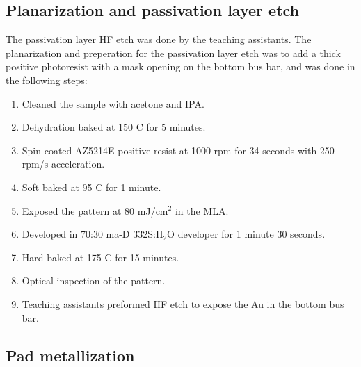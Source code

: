 \subsection{Planarization and passivation layer etch}
\label{methods:Planarization}

The passivation layer HF etch was done by the teaching assistants.
The planarization and preperation for the passivation layer etch was to add a thick positive photoresist with a mask opening on the bottom bus bar, and was done in the following steps:

\begin{enumerate}
    \item Cleaned the sample with acetone and IPA.
    \item Dehydration baked at 150 \textdegree C for 5 minutes.
    \item Spin coated AZ5214E positive resist at 1000 rpm for 34 seconds with 250 rpm/s acceleration.
    \item Soft baked at 95 \textdegree C for 1 minute.
    \item Exposed the pattern at 80 mJ/cm$^2$ in the MLA.
    \item Developed in 70:30 ma-D 332S:H$_2$O developer for 1 minute 30 seconds.
    \item Hard baked at 175 \textdegree C for 15 minutes.
    \item Optical inspection of the pattern.
    \item Teaching assistants preformed HF etch to expose the Au in the bottom bus bar.
\end{enumerate}



\subsection{Pad metallization}
\label{methods:pad_metallization}


